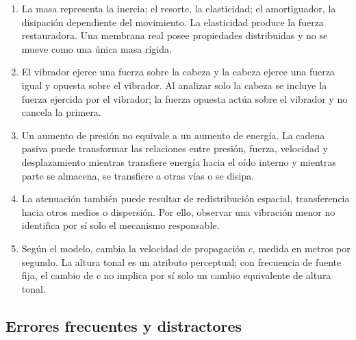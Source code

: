 \begin{enumerate}[label=\textbf{F\arabic*.},leftmargin=*]
    \item La masa representa la inercia; el resorte, la elasticidad; el
    amortiguador, la disipación dependiente del movimiento. La elasticidad
    produce la fuerza restauradora. Una membrana real posee propiedades
    distribuidas y no se mueve como una única masa rígida.

    \item El vibrador ejerce una fuerza sobre la cabeza y la cabeza ejerce una
    fuerza igual y opuesta sobre el vibrador. Al analizar solo la cabeza se
    incluye la fuerza ejercida por el vibrador; la fuerza opuesta actúa sobre el
    vibrador y no cancela la primera.

    \item Un aumento de presión no equivale a un aumento de energía. La cadena
    pasiva puede transformar las relaciones entre presión, fuerza, velocidad y
    desplazamiento mientras transfiere energía hacia el oído interno y mientras
    parte se almacena, se transfiere a otras vías o se disipa.

    \item La atenuación también puede resultar de redistribución espacial,
    transferencia hacia otros medios o dispersión. Por ello, observar una
    vibración menor no identifica por sí solo el mecanismo responsable.

    \item Según el modelo, cambia la velocidad de propagación \(c\), medida en
    metros por segundo. La altura tonal es un atributo perceptual; con
    frecuencia de fuente fija, el cambio de \(c\) no implica por sí solo un
    cambio equivalente de altura tonal.
\end{enumerate}

\subsection*{Errores frecuentes y distractores}

